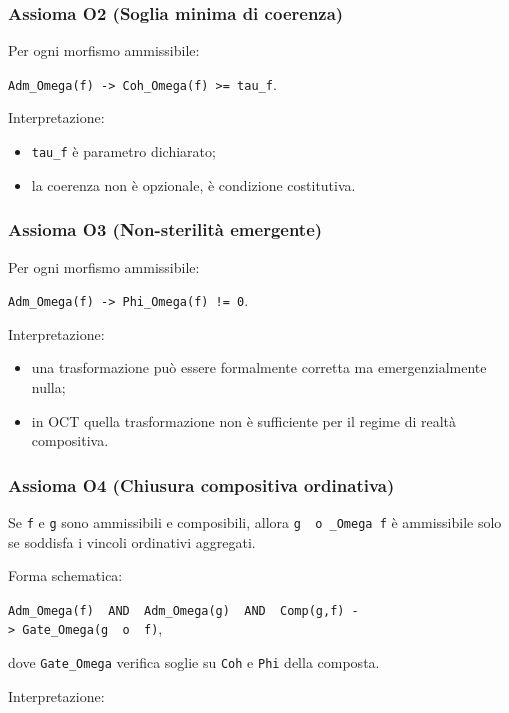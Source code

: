 \subsubsection{Assioma O2 (Soglia minima di coerenza)}

Per ogni morfismo ammissibile:

\texttt{Adm\_Omega(f)\ -\textgreater{}\ Coh\_Omega(f)\ \textgreater{}=\ tau\_f}.

Interpretazione:

\begin{itemize}
\tightlist
\item
  \texttt{tau\_f} è parametro dichiarato;
\item
  la coerenza non è opzionale, è condizione costitutiva.
\end{itemize}

\subsubsection{Assioma O3 (Non-sterilità emergente)}

Per ogni morfismo ammissibile:

\texttt{Adm\_Omega(f)\ -\textgreater{}\ Phi\_Omega(f)\ !=\ 0}.

Interpretazione:

\begin{itemize}
\tightlist
\item
  una trasformazione può essere formalmente corretta ma emergenzialmente nulla;
\item
  in OCT quella trasformazione non è sufficiente per il regime di realtà compositiva.
\end{itemize}

\subsubsection{Assioma O4 (Chiusura compositiva ordinativa)}

Se \texttt{f} e \texttt{g} sono ammissibili e composibili, allora \texttt{g\ \ o\ \_Omega\ f} è ammissibile solo se soddisfa i vincoli ordinativi aggregati.

Forma schematica:

\texttt{Adm\_Omega(f)\ \ AND\ \ Adm\_Omega(g)\ \ AND\ \ Comp(g,f)\ -\textgreater{}\ Gate\_Omega(g\ \ o\ \ f)},

dove \texttt{Gate\_Omega} verifica soglie su \texttt{Coh} e \texttt{Phi} della composta.

Interpretazione:

